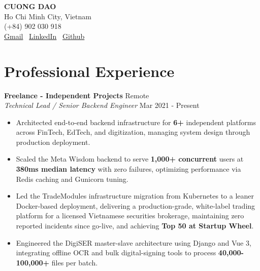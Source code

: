 \documentclass[10pt]{article}
\begin{document}
\begin{center}
    {\Huge \textbf{CUONG DAO}} \\ \vspace{6pt}
    Ho Chi Minh City, Vietnam \\
    (+84) 902 030 918 \\
    \href{mailto:dqcuong93@gmail.com}{Gmail} \textbullet \ \href{https://www.linkedin.com/in/cuongdao93}{LinkedIn} \textbullet \ \href{https://github.com/dqcuong93}{Github} \\
\end{center}

\vspace{-2pt}

\section{Professional Experience}

\textbf{Freelance - Independent Projects} \hfill Remote \\
\textit{Technical Lead / Senior Backend Engineer} \hfill Mar 2021 - Present
\begin{itemize}[itemsep=1pt, topsep=2pt]
    \item Architected end-to-end backend infrastructure for \textbf{6+} independent platforms across FinTech, EdTech, and digitization, managing system design through production deployment.
    \item Scaled the Meta Wisdom backend to serve \textbf{1,000+ concurrent} users at \textbf{380ms median latency} with zero failures, optimizing performance via Redis caching and Gunicorn tuning.
    \item Led the TradeModules infrastructure migration from Kubernetes to a leaner Docker-based deployment, delivering a production-grade, white-label trading platform for a licensed Vietnamese securities brokerage, maintaining zero reported incidents since go-live, and achieving \textbf{Top 50 at Startup Wheel}.
    \item Engineered the DigiSER master-slave architecture using Django and Vue 3, integrating offline OCR and bulk digital-signing tools to process \textbf{40,000-100,000+} files per batch.
\end{itemize}

\vspace{6pt}
\end{document}
